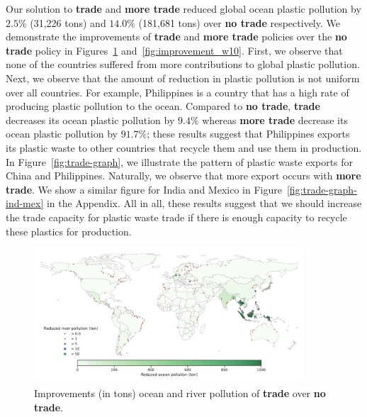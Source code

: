 \documentclass[dvipsnames]{article}
\begin{document}
Our solution to \textbf{trade} and \textbf{more trade} reduced global ocean plastic pollution by $2.5\%$ (31,226 tons) and $14.0\%$ (181,681 tons) over \textbf{no trade} respectively.
We demonstrate the improvements of \textbf{trade} and \textbf{more trade} policies over the \textbf{no trade} policy in Figures~\ref{fig:improvement_w1} and~\ref{fig:improvement_w10}. 
First, we observe that none of the countries suffered from more contributions to global plastic pollution. Next, we observe that the amount of reduction in plastic pollution is not uniform over all countries. For example, Philippines is a country that has a high rate of producing plastic pollution to the ocean. Compared to \textbf{no trade}, \textbf{trade} decreases its ocean plastic pollution by $9.4\%$ whereas \textbf{more trade} decrease its ocean plastic pollution by $91.7\%$; these results suggest that Philippines exports its plastic waste to other countries that recycle them and use them in production. In Figure~\ref{fig:trade-graph}, we illustrate the pattern of plastic waste exports for China and Philippines. Naturally, we observe that more export occurs with \textbf{more trade}. We show a similar figure for India and Mexico in Figure~\ref{fig:trade-graph-ind-mex} in the Appendix. All in all, these results suggest that we should increase the trade capacity for plastic waste trade if there is enough capacity to recycle these plastics for production.

\begin{figure}[htb!] 
	\centering
		\includegraphics[width=0.9\textwidth]{figures/improvement_w1_ton.pdf}
	\caption{\small Improvements (in tons) ocean and river pollution of \textbf{trade} over \textbf{no trade}.}
	\label{fig:improvement_w1}
\end{figure}
\end{document}
